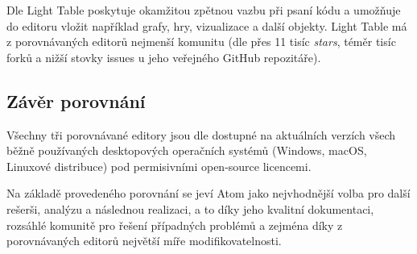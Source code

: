 Dle \cite{light-table-docs} Light Table poskytuje okamžitou zpětnou vazbu při psaní kódu a umožňuje do editoru vložit
například grafy, hry, vizualizace a další objekty. Light Table má z porovnávaných editorů nejmenší komunitu (dle \cite
{light-table-github} přes 11 tisíc \textit{stars}, téměr tisíc forků a nižší stovky issues u jeho veřejného GitHub
repozitáře).

\subsection{Závěr porovnání}

Všechny tři porovnávané editory jsou dle \cite{atom-github, vscode-github, light-table-github} dostupné na aktuálních
verzích všech běžně používaných desktopových operačních systémů (Windows, macOS, Linuxové distribuce) pod permisivními
open-source licencemi.

Na základě provedeného porovnání se jeví Atom jako nejvhodnější volba pro další rešerši, analýzu a následnou realizaci,
a to díky jeho kvalitní dokumentaci, rozsáhlé komunitě pro řešení případných problémů a zejména díky z porovnávaných
editorů největší míře modifikovatelnosti.
